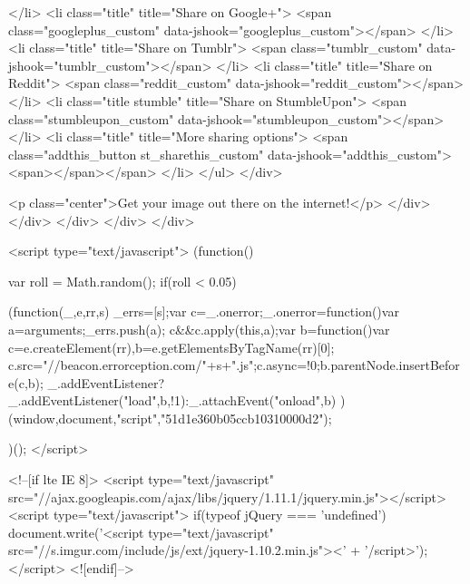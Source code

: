         </li>
        <li class="title" title="Share on Google+">
            <span class="googleplus_custom" data-jshook="googleplus_custom"></span>
        </li>
        <li class="title" title="Share on Tumblr">
            <span class="tumblr_custom" data-jshook="tumblr_custom"></span>
        </li>
        <li class="title" title="Share on Reddit">
            <span class="reddit_custom" data-jshook="reddit_custom"></span>
        </li>
        <li class="title stumble" title="Share on StumbleUpon">
            <span class="stumbleupon_custom" data-jshook="stumbleupon_custom"></span>
        </li>
        <li class="title" title="More sharing options">
            <span class="addthis_button st_sharethis_custom" data-jshook="addthis_custom"><span></span></span>
        </li>
    </ul>
</div>

                    <p class="center">Get your image out there on the internet!</p>
                </div>
            </div>
        </div>
    </div>
</div>
    

        

    

            
    

    

            <script type="text/javascript">
            (function() {
                var roll = Math.random();
                if(roll < 0.05) {
                    
                    (function(_,e,rr,s){
                        _errs=[s];var c=_.onerror;_.onerror=function(){var a=arguments;_errs.push(a);
                        c&&c.apply(this,a)};var b=function(){var c=e.createElement(rr),b=e.getElementsByTagName(rr)[0];
                        c.src="//beacon.errorception.com/"+s+".js";c.async=!0;b.parentNode.insertBefore(c,b)};
                        _.addEventListener?_.addEventListener("load",b,!1):_.attachEvent("onload",b)
                    })(window,document,"script","51d1e360b05ccb10310000d2");
                    
                }
            })();
        </script>

        
<!--[if lte IE 8]>
<script type="text/javascript" src="//ajax.googleapis.com/ajax/libs/jquery/1.11.1/jquery.min.js"></script>
<script type="text/javascript">
if(typeof jQuery === 'undefined') {
    document.write('<script type="text/javascript" src="//s.imgur.com/include/js/ext/jquery-1.10.2.min.js"><' + '/script>');
}
</script>
<![endif]-->

